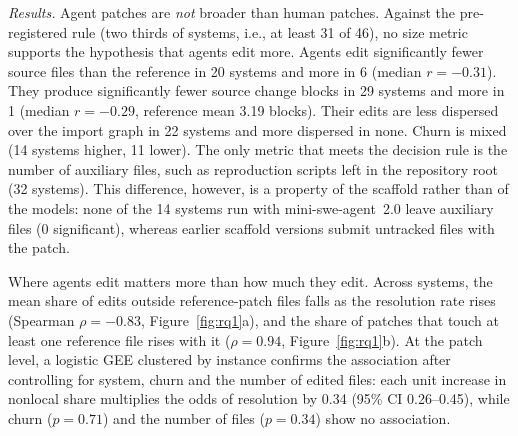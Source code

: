 \documentclass[a4paper,fleqn]{cas-sc}
\newcommand{\rqoneAuxGreater}{32}
\newcommand{\rqoneBlocksGreater}{1}
\newcommand{\rqoneBlocksLess}{29}
\newcommand{\rqoneBlocksMedR}{-0.29}
\newcommand{\rqoneChurnGreater}{14}
\newcommand{\rqoneChurnLess}{11}
\newcommand{\rqoneDispLess}{22}
\newcommand{\rqoneFilesGreater}{6}
\newcommand{\rqoneFilesLess}{20}
\newcommand{\rqoneFilesMedR}{-0.31}
\newcommand{\rqoneGeeChurnP}{0.71}
\newcommand{\rqoneGeeFilesP}{0.34}
\newcommand{\rqoneGeeNonlocalHi}{0.45}
\newcommand{\rqoneGeeNonlocalLo}{0.26}
\newcommand{\rqoneGeeNonlocalOR}{0.34}
\newcommand{\rqoneGoldBlocks}{3.19}
\newcommand{\rqoneRhoNonlocal}{-0.83}
\newcommand{\rqoneRhoTouches}{0.94}
\newcommand{\rqoneSystems}{46}
\newcommand{\rqoneVtwoAuxGreater}{0}
\newcommand{\rqoneVtwoSystems}{14}
\begin{document}
\emph{Results.} Agent patches are \emph{not} broader than human patches. Against the pre-registered rule (two thirds of systems, i.e., at least 31 of \rqoneSystems{}), no size metric supports the hypothesis that agents edit more. Agents edit significantly fewer source files than the reference in \rqoneFilesLess{} systems and more in \rqoneFilesGreater{} (median $r=\rqoneFilesMedR$). They produce significantly fewer source change blocks in \rqoneBlocksLess{} systems and more in \rqoneBlocksGreater{} (median $r=\rqoneBlocksMedR$, reference mean \rqoneGoldBlocks{} blocks). Their edits are less dispersed over the import graph in \rqoneDispLess{} systems and more dispersed in none. Churn is mixed (\rqoneChurnGreater{} systems higher, \rqoneChurnLess{} lower). The only metric that meets the decision rule is the number of auxiliary files, such as reproduction scripts left in the repository root (\rqoneAuxGreater{} systems). This difference, however, is a property of the scaffold rather than of the models: none of the \rqoneVtwoSystems{} systems run with mini-swe-agent~2.0 leave auxiliary files (\rqoneVtwoAuxGreater{} significant), whereas earlier scaffold versions submit untracked files with the patch.

Where agents edit matters more than how much they edit. Across systems, the mean share of edits outside reference-patch files falls as the resolution rate rises (Spearman $\rho=\rqoneRhoNonlocal$, Figure~\ref{fig:rq1}a), and the share of patches that touch at least one reference file rises with it ($\rho=\rqoneRhoTouches$, Figure~\ref{fig:rq1}b). At the patch level, a logistic GEE clustered by instance confirms the association after controlling for system, churn and the number of edited files: each unit increase in nonlocal share multiplies the odds of resolution by \rqoneGeeNonlocalOR{} (95\% CI \rqoneGeeNonlocalLo--\rqoneGeeNonlocalHi), while churn ($p=\rqoneGeeChurnP$) and the number of files ($p=\rqoneGeeFilesP$) show no association.
\end{document}
